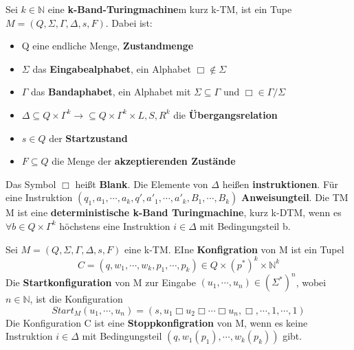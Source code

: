  Sei $k \in \mathbb{N}$ eine \textbf{k-Band-Turingmachine}m kurz k-TM, ist ein Tupe $M = (Q, \Sigma, \varGamma, \Delta, s, F )$. Dabei ist:
\begin{itemize}
  \item Q eine endliche Menge, \textbf{Zustandmenge}
  \item $\Sigma$ das \textbf{Eingabealphabet}, ein Alphabet $\Box \not \in \Sigma$
  \item $\varGamma$ das \textbf{Bandaphabet}, ein Alphabet mit $\Sigma \subseteq \varGamma$ und $\Box \in \varGamma / \Sigma$ 
  \item $\Delta \subseteq Q \times \varGamma^{k} \rightarrow \subseteq Q \times \varGamma^{k} \times {L, S, R}^{k}$ die \textbf{Übergangsrelation}
  \item $s \in Q$ der \textbf{Startzustand}
  \item $F \subseteq Q$ die Menge der \textbf{akzeptierenden Zustände} 
\end{itemize}
\begin{sloppypar}
  \noindent Das Symbol $\Box$ heißt \textbf{Blank}. Die Elemente von $\Delta$ heißen \textbf{instruktionen}. Für eine Instruktion $(q_{1}, a_{1}, \cdots, a_{k}, q', a'_{1}, \cdots, a'_{k}, B_{1}, \cdots, B_{k})$ \textbf{Anweisungteil}. Die TM M ist eine \textbf{deterministische k-Band Turingmachine}, kurz k-DTM, wenn es $\forall b \in Q \times \varGamma^{k}$ höchstens eine Instruktion $i \in \Delta$ mit Bedingungsteil b.
\end{sloppypar}

 Sei $M = (Q, \Sigma, \Gamma, \Delta, s, F)$ eine k-TM. EIne \textbf{Konfigration} von M ist ein Tupel \[C = (q, w_{1}, \cdots, w_{k}, p_{1}, \cdots, p_{k}) \in Q \times (p^{*})^{k} \times \mathbb{N}^{k}\] Die \textbf{Startkonfiguration} von M zur Eingabe $(u_{1}, \cdots, u_{n}) \in (\Sigma^{*})^{n}$, wobei $n \in \mathbb{N}$, ist die Konfiguration \[Start_{M}(u_{1}, \cdots, u_{n}) = (s, u_{1} \Box u_{2} \Box \cdots \Box u_{n}, \Box, \cdots, 1, \cdots, 1)\] Die Konfiguration C ist eine \textbf{Stoppkonfigration} von M, wenn es keine Instruktion $i \in \Delta$ mit Bedingungsteil $(q, w_{1}(p_{1}), \cdots, w_{k}(p_{k}))$ gibt.


